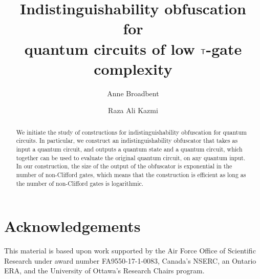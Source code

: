 \documentclass[english,11pt]{article}
\title{Indistinguishability obfuscation \\for\\ quantum circuits of low ${\sf T}$-gate complexity}
\author[1]{Anne Broadbent}
\author[2]{Raza Ali Kazmi}
\affil[1]{Anne affiliation}
\affil[2]{Raza affiliation}
\begin{document}
\maketitle

\begin{abstract}

We initiate the study of constructions for indistinguishability obfuscation for quantum circuits. In particular, we construct an indistinguishability  obfuscator that takes as input a quantum circuit, and outputs a quantum state and a quantum circuit, which together can be used to evaluate the original quantum circuit, on any quantum input.  In our construction, the size of the output of the obfuscator is exponential in the number of non-Clifford gates, which means that the construction is efficient as long as the number of non-Clifford gates is logarithmic.
\end{abstract}









%




%





\section*{Acknowledgements}
This material is based upon work supported by the Air Force Office of Scientific Research under award number FA9550-17-1-0083, Canada's NSERC, an Ontario ERA, and the University of Ottawa’s Research Chairs program.






\end{document}
